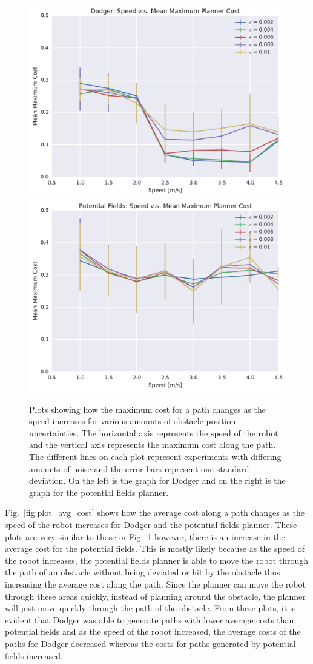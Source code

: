 \begin{figure}[h!]
    \centering
    \includegraphics[width=0.48\linewidth]{figs/planner_mean_max_cost_0}
    \includegraphics[width=0.48\linewidth]{figs/pf_mean_max_cost_0}

    \caption{Plots showing how the maximum cost for a path changes as the
        speed increases for various amounts of obstacle position uncertainties.
        The horizontal axis represents the speed of the robot and the vertical
        axis represents the maximum cost along the path. The different lines on
    each plot represent experiments with differing amounts of noise and the
error bars represent one standard deviation.  On the left is the graph for
Dodger and on the right is the graph for the potential fields planner.}

    \label{fig:plot_max_cost}
\end{figure}

Fig.~\ref{fig:plot_avg_cost} shows how the average cost along a path changes as
the speed of the robot increases for Dodger and the potential fields planner.
These plots are very similar to those in Fig.~\ref{fig:plot_max_cost} however,
there is an increase in the average cost for the potential fields. This is
mostly likely because as the speed of the robot increases, the potential fields
planner is able to move the robot through the path of an obstacle without being
deviated or hit by the obstacle thus increasing the average cost along the
path. Since the planner can move the robot through these areas quickly, instead
of planning around the obstacle, the planner will just move quickly through the
path of the obstacle. From these plots, it is evident that Dodger was able to
generate paths with lower average costs than potential fields and as the speed
of the robot increased, the average costs of the paths for Dodger decreased
whereas the costs for paths generated by potential fields increased.

